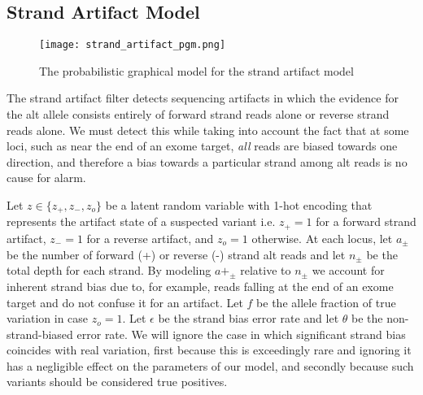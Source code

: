\documentclass[nofootinbib,amssymb,amsmath]{revtex4}
\begin{document}
\subsection{Strand Artifact Model}

\begin{figure}
\centering
\texttt{[image: strand\_artifact\_pgm.png]}
\caption{\label{fig:strand artifact}The probabilistic graphical model for the strand artifact model}
\end{figure}

The strand artifact filter detects sequencing artifacts in which the evidence for the alt allele consists entirely of forward strand reads alone or reverse strand reads alone. We must detect this while taking into account the fact that at some loci, such as near the end of an exome target, \emph{all} reads are biased towards one direction, and therefore a bias towards a particular strand among alt reads is no cause for alarm.

Let $z \in \{ z_+, z_-, z_o \}$ be a latent random variable with 1-hot encoding that represents the artifact state of a suspected variant i.e. $z_+ = 1$ for a forward strand artifact, $z_- = 1$ for a reverse artifact, and $z_o = 1$ otherwise. At each locus, let $a_\pm$ be the number of forward (+) or reverse (-) strand alt reads and let $n_\pm$ be the total depth for each strand.  By modeling $a+_\pm$ relative to $n_\pm$ we account for inherent strand bias due to, for example, reads falling at the end of an exome target and do not confuse it for an artifact.  Let $f$ be the allele fraction of true variation in case $z_o = 1$.  Let $\epsilon$ be the strand bias error rate and let $\theta$ be the non-strand-biased error rate.  We will ignore the case in which significant strand bias coincides with real variation, first because this is exceedingly rare and ignoring it has a negligible effect on the parameters of our model, and secondly because such variants should be considered true positives.
\end{document}
